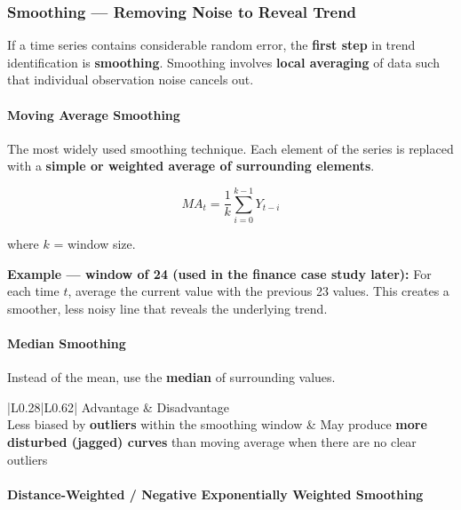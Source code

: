 \documentclass[12pt,openany]{book}
\begin{document}
\subsubsection{Smoothing --- Removing Noise to Reveal Trend}

If a time series contains considerable random error, the \textbf{first step} in trend identification is \textbf{smoothing}. Smoothing involves \textbf{local averaging} of data such that individual observation noise cancels out.

\paragraph{Moving Average Smoothing}

The most widely used smoothing technique. Each element of the series is replaced with a \textbf{simple or weighted average of surrounding elements}.

\begin{equation*}
    MA_t = \frac{1}{k}\sum_{i=0}^{k-1} Y_{t-i}
\end{equation*}

where \(k\) = window size.

\textbf{Example --- window of 24 (used in the finance case study later):}
For each time \(t\), average the current value with the previous 23 values. This creates a smoother, less noisy line that reveals the underlying trend.

\paragraph{Median Smoothing}

Instead of the mean, use the \textbf{median} of surrounding values.

\begin{center}
\begin{tabular}{|L{0.28\textwidth}|L{0.62\textwidth}|}
\hline
Advantage & Disadvantage \\
\hline
Less biased by \textbf{outliers} within the smoothing window & May produce \textbf{more disturbed (jagged) curves} than moving average when there are no clear outliers \\
\hline
\end{tabular}
\end{center}

\paragraph{Distance-Weighted / Negative Exponentially Weighted Smoothing}
\end{document}
